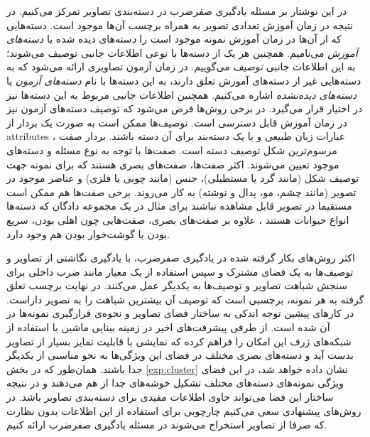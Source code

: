 در این نوشتار بر مسئله یادگیری صفرضرب در دسته‌بندی تصاویر تمرکز می‌کنیم. در نتیجه در زمان آموزش تعدادی تصویر به همراه برچسب آن‌ها موجود است. دسته‌هایی که از آن‌ها در زمان آموزش نمونه موجود است را {\emph دسته‌های دیده شده} یا \emph{ دسته‌های آموزش} می‌نامیم. همچنین هر یک از دسته‌ها با نوعی اطلاعات جانبی توصیف می‌شوند؛ به این اطلاعات جانبی \emph{ توصیف}  می‌گوییم. در زمان آزمون تصاویری ارائه می‌شود که به دسته‌هایی غیر از دسته‌های آموزش تعلق دارند، به این دسته‌ها با نام\emph{  دسته‌های آزمون}  یا \emph{ دسته‌های دیده‌نشده}  اشاره می‌کنیم. همچنین اطلاعات جانبی مربوط به این دسته‌ها نیز در اختیار قرار می‌گیرد. در برخی روش‌ها فرض می‌شود که توصیف دسته‌های آزمون نیز در زمان آموزش قابل دسترسی است. توصیف‌ها ممکن است به صورت یک بردار از
\glspl{attribute}
 \cite{farhadi09}،
 عبارات زبان طبیعی
 \cite{ng13, mohamed13, convex}
 و یا یک دسته‌بند برای آن دسته  \cite{Yu2013} باشند. بردار صفت مرسوم‌ترین شکل توصیف دسته است. صفت‌ها با توجه به نوع مسئله و دسته‌های موجود تعیین می‌شوند. اکثر صفت‌ها، صفت‌های بصری هستند که برای نمونه جهت توصیف  شکل (مانند گرد یا مستطیلی)، جنس (مانند چوبی یا فلزی) و عناصر موجود در تصویر (مانند چشم، مو، پدال و نوشته) به کار می‌روند. برخی صفت‌ها هم ممکن است مستقیما در تصویر قابل مشاهده نباشند برای مثال در یک مجموعه دادگان که دسته‌ها انواع حیوانات هستند
 \cite{lampert09}،
 علاوه بر صفت‌های بصری، صفت‌هایی چون اهلی بودن، سریع‌ بودن یا گوشت‌خوار بودن هم وجود دارد.

 اکثر روش‌های بکار گرفته شده در یادگیری صفرضرب، با یادگیری نگاشتی از تصاویر و توصیف‌ها به یک فضای مشترک و سپس استفاده از یک معیار مانند ضرب داخلی برای سنجش شباهت تصاویر و توصیف‌ها به یکدیگر عمل می‌کنند. در نهایت برچسب تعلق گرفته به هر نمونه، برچسبی است که توصیف آن بیشترین شباهت را به تصویر داراست. در کارهای پیشین توجه اندکی به ساختار فضای تصاویر و نحوه‌ی قرارگیری نمونه‌ها در آن شده است. از طرفی پیشرفت‌های اخیر در زمینه بینایی ماشین با استفاده از شبکه‌های ژرف \cite{vgg} این امکان را فراهم کرده که نمایشی با قابلیت تمایز بسیار از تصاویر بدست آید و دسته‌های بصری مختلف در فضای این ویژگی‌ها به نحو مناسبی از یکدیگر جدا باشند. همان‌طور که در بخش \ref{exp:cluster} نشان داده خواهد شد، در این فضای ویژگی  نمونه‌های دسته‌های مختلف تشکیل خوشه‌های جدا از هم می‌دهند و در نتیجه ساختار این فضا می‌تواند حاوی اطلاعات مفیدی برای دسته‌بندی تصاویر باشد. در روش‌های پیشنهادی سعی می‌کنیم چارچوبی برای استفاده از این اطلاعات بدون نظارت که صرفا از تصاویر استخراج می‌شوند در مسئله یادگیری صفرضرب ارائه کنیم.


